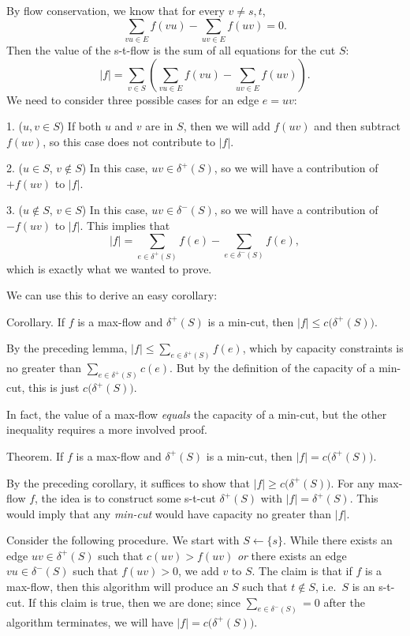 \proof By flow conservation, we know that for every $v \neq s,t$,
$$\sum_{vu\in E} f(vu) - \sum_{uv\in E} f(uv) = 0.$$
Then the value of the s-t-flow is the sum of all equations for the cut $S$:
$$|f| = \sum_{v\in S} \left( \sum_{vu\in E} f(vu) - \sum_{uv\in E} f(uv) \right).$$
We need to consider three possible cases for an edge $e = uv$:
\medskip
\item {1.} ($u, v\in S$) If both $u$ and $v$ are in $S$, then we will add $f(uv)$ and then subtract $f(uv)$, so this case does not contribute to $|f|$.
\smallskip
\item {2.} ($u\in S$, $v\notin S$) In this case, $uv\in \delta^+(S)$, so we will have a contribution of $+f(uv)$ to $|f|$.
\smallskip
\item {3.} ($u\notin S$, $v\in S$) In this case, $uv\in \delta^-(S)$, so we will have a contribution of $-f(uv)$ to $|f|$.
\medskip
This implies that
$$ |f| = \sum_{e\in \delta^+(S)} f(e) - \sum_{e\in \delta^-(S)} f(e) ,$$
which is exactly what we wanted to prove.\slug

We can use this to derive an easy corollary:

\proclaim Corollary. If $f$ is a max-flow and $\delta^+(S)$ is a min-cut, then $|f| \leq c\big(\delta^+(S)\big)$.

\proof By the preceding lemma, $|f| \leq \sum_{e\in \delta^+(S)} f(e)$, which by capacity constraints is no greater than $\sum_{e\in \delta^+(S)} c(e)$. But by the definition of the capacity of a min-cut, this is just $c\big(\delta^+(S)\big)$. \slug

In fact, the value of a max-flow {\it equals} the capacity of a min-cut, but the other inequality requires a more involved proof.

\proclaim Theorem. If $f$ is a max-flow and $\delta^+(S)$ is a min-cut, then $|f| = c\big(\delta^+(S)\big)$.

\proof By the preceding corollary, it suffices to show that $|f| \geq c\big(\delta^+(S)\big)$. For any max-flow $f$, the idea is to construct some s-t-cut $\delta^+(S)$ with $|f| = \delta^+(S)$. This would imply that any {\it min-cut} would have capacity no greater than $|f|$.

Consider the following procedure. We start with $S\gets \{s\}$. While there exists an edge $uv\in \delta^+(S)$ such that $c(uv) > f(uv)$ {\it or} there exists an edge $vu\in \delta^-(S)$ such that $f(uv) > 0$, we add $v$ to $S$. The claim is that if $f$ is a max-flow, then this algorithm will produce an $S$ such that $t\notin S$, i.e.\  $S$ is an s-t-cut. If this claim is true, then we are done; since $\sum_{e\in \delta^-(S)} = 0$ after the algorithm terminates, we will have $|f| = c\big(\delta^+(S)\big)$.

